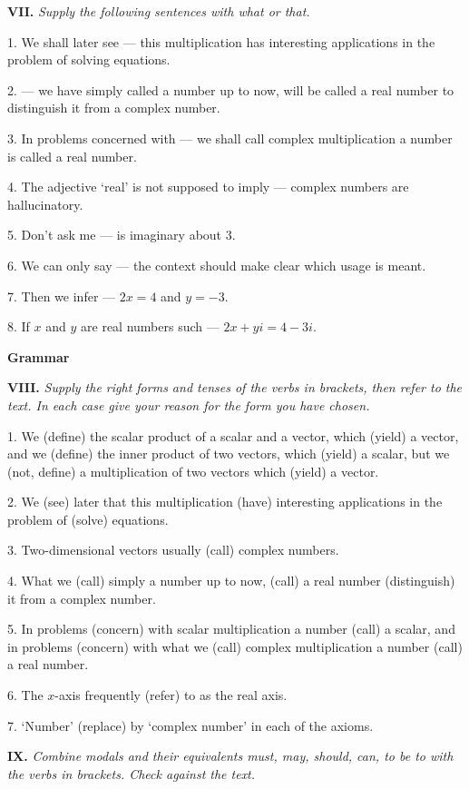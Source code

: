 \documentclass[a4paper]{article}
\newcommand{\ESect}[1]{\medskip\par{\large \textbf{#1}}\par}
\newcommand{\ETask}[2]{\medskip\par\textbf{#1.} \textit{#2}\par}
\begin{document}
\ETask{VII}{Supply the following sentences with what or that.}

1. We shall later see --- this multiplication has interesting applications in the problem of solving equations.

2. --- we have simply called a number up to now, will be called a real number to distinguish it from a complex number.

3. In problems concerned with --- we shall call complex multiplication a number is called a real number.

4. The adjective `real' is not supposed to imply --- complex numbers are hallucinatory.

5. Don't ask me --- is imaginary about 3.

6. We can only say --- the context should make clear which usage is meant.

7. Then we infer --- $2x=4$ and $y=-3$.

8. If $x$ and $y$ are real numbers such --- $2x+yi=4-3i$.

\ESect{Grammar}

\ETask{VIII}{Supply the right forms and tenses of the verbs in brackets, then refer to the text. In each case give your reason
for the form you have chosen.}

1. We (define) the scalar product of a scalar and a vector, which (yield) a vector, and we (define) the inner product of two
vectors, which (yield) a scalar, but we (not, define) a multiplication of two vectors which (yield) a vector.

2. We (see) later that this multiplication (have) interesting applications in the problem of (solve) equations.

3. Two-dimensional vectors usually (call) complex numbers.

4. What we (call) simply a number up to now, (call) a real number (distinguish) it from a complex number.

5. In problems (concern) with scalar multiplication a number (call) a scalar, and in problems (concern) with what we (call)
complex multiplication a number (call) a real number.

6. The $x$-axis frequently (refer) to as the real axis.

7. `Number' (replace) by `complex number' in each of the axioms.

\ETask{IX}{Combine modals and their equivalents must, may, should, can, to be to with the verbs in brackets. Check against the text.}
\end{document}
